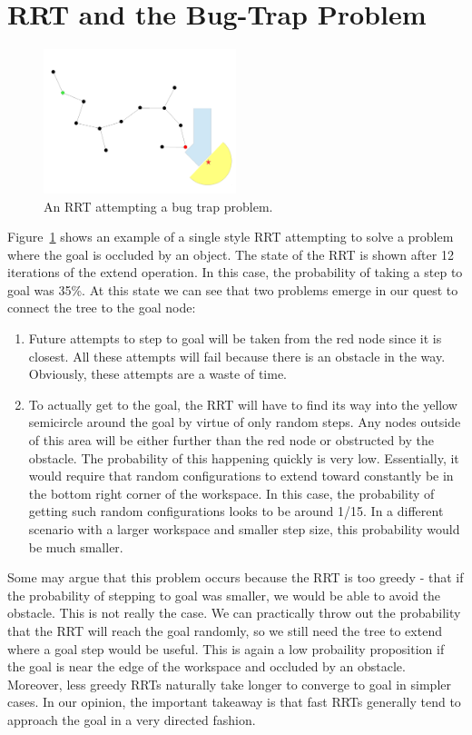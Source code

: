 \documentclass[conference]{IEEEtran}
\begin{document}
\section{RRT and the Bug-Trap Problem}
\label{sec:bugtraprrt}

\begin{figure}[h!]
  \centering
    \includegraphics[width=0.5\textwidth]{figures/BugTrapRRT.pdf}
  \caption{An RRT attempting a bug trap problem. \label{fig:BugTrapRRT} }
\end{figure}

Figure~\ref{fig:BugTrapRRT} shows an example of a single style RRT attempting to solve a problem where the goal is occluded by an object.
The state of the RRT is shown after 12 iterations of the extend operation. In this case, the probability of taking a step to goal was
35\%. At this state we can see that two problems emerge in our quest to connect the tree to the goal node:
\begin{enumerate}
\item Future attempts to step to goal will be taken from the red node since it is closest. All these attempts will fail because there is an
obstacle in the way. Obviously, these attempts are a waste of time.
\item To actually get to the goal, the RRT will have to find its way into the yellow semicircle around the goal by virtue of only random
steps. Any nodes outside of this area will be either further than the red node or obstructed by the obstacle. The probability of this
happening quickly is very low. Essentially, it would require that random configurations to extend toward constantly be in the bottom right
corner of the workspace. In this case, the probability of getting such random configurations looks to be around 1/15. In a different
scenario with a larger workspace and smaller step size, this probability would be much smaller. 
\end{enumerate}

Some may argue that this problem occurs because the RRT is too greedy - that if the probability of stepping to goal was smaller, we would be
able to avoid the obstacle. This is not really the case. We can practically throw out the probability that the RRT will reach the goal
randomly, so we still need the tree to extend where a goal step would be useful. This is again a low probaility proposition if the goal is
near the edge of the workspace and occluded by an obstacle. Moreover, less greedy RRTs naturally take longer to converge to goal in simpler
cases. In our opinion, the important takeaway is that fast RRTs generally tend to approach the goal in a very directed fashion.
\end{document}
